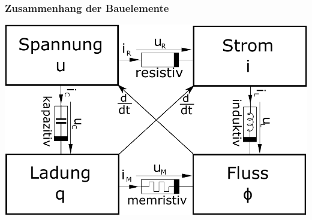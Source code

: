\documentclass[fs, footer]{latex4ei}
\begin{document}
\begin{multicols*}{4}
    \subsubsection{Zusammenhang der Bauelemente}
    \begin{center}
        \includegraphics[scale=0.3]{./img/reactance_overview.pdf}
    \end{center}

\end{multicols*}
\end{document}
